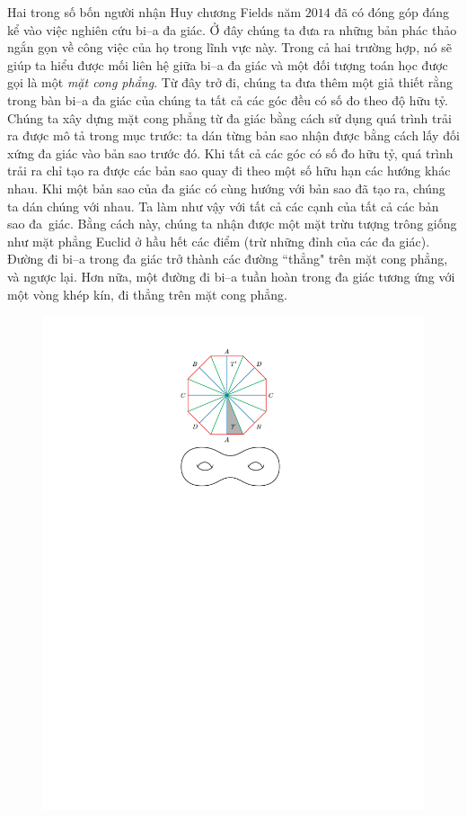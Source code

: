\begin{multicols}{2}
	\vskip 0.1cm
	Hai trong số bốn người nhận Huy chương Fields năm $2014$ đã có đóng góp đáng kể vào việc nghiên cứu bi--a đa giác. Ở đây chúng ta đưa ra những bản phác thảo ngắn gọn về công việc của họ trong lĩnh vực này. Trong cả hai trường hợp, nó sẽ giúp ta hiểu được mối liên hệ giữa bi--a đa giác và một đối tượng toán học được gọi là một \emph{mặt cong phẳng}.
	\vskip 0.1cm
	Từ đây trở đi, chúng ta đưa thêm một giả thiết rằng trong bàn bi--a đa giác của chúng ta tất cả các góc đều có số đo theo độ hữu tỷ. Chúng ta xây dựng mặt cong phẳng
	từ đa giác bằng cách sử dụng quá trình trải ra được mô tả trong mục trước: ta dán từng bản sao nhận được bằng cách lấy đối xứng đa giác vào bản sao trước đó. Khi tất cả
	các góc có số đo hữu tỷ, quá trình trải ra chỉ tạo ra được các bản sao quay đi theo một số hữu hạn các hướng khác nhau. Khi một bản sao của đa giác có cùng hướng với bản sao đã tạo ra,  chúng ta dán chúng với nhau. Ta làm như vậy với tất cả các cạnh của tất cả các bản sao đa~giác.
	\vskip 0.1cm
	Bằng cách này, chúng ta nhận được một mặt trừu tượng trông giống như mặt phẳng Euclid ở hầu hết các điểm (trừ những đỉnh của các đa giác). Đường đi bi--a trong
	đa giác trở thành các đường ``thẳng" trên mặt cong phẳng, và ngược lại. Hơn nữa, một đường đi bi--a tuần hoàn trong đa giác tương ứng với một vòng khép kín, đi thẳng trên
	mặt cong phẳng.
	\begin{figure}[H]
		\vspace*{-10pt}
		\centering
		\captionsetup{labelformat= empty, justification=centering}
		\includegraphics[width= 1\linewidth]{7}

\end{figure}
\end{multicols}
